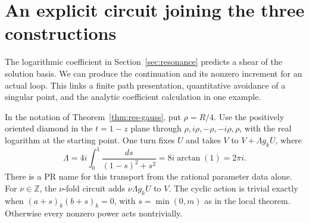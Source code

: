 \section{An explicit circuit joining the three constructions}\label{sec:circuit}
The logarithmic coefficient in Section~\ref{sec:resonance} predicts a shear of the solution basis. We can produce the continuation and its nonzero increment for an actual loop. This links a finite path presentation, quantitative avoidance of a singular point, and the analytic coefficient calculation in one example.

\begin{theorem}\label{thm:circuit}
In the notation of Theorem~\ref{thm:res-gauss}, put $\rho=R/4$. Use the positively oriented diamond in the $t=1-z$ plane through $\rho,i\rho,-\rho,-i\rho,\rho$, with the real logarithm at the starting point. One turn fixes $U$ and takes $V$ to $V+\Lambda g_kU$, where
\[
 \Lambda=4i\int_0^1\frac{ds}{(1-s)^2+s^2}
         =8i\arctan(1)=2\pi i .
\]
There is a PR name for this transport from the rational parameter data alone. For $\nu\in\mathbb Z$, the $\nu$-fold circuit adds $\nu\Lambda g_k U$ to $V$. The cyclic action is trivial exactly when $(a+s)_k(b+s)_k=0$, with $s=\min(0,m)$ as in the local theorem. Otherwise every nonzero power acts nontrivially.
\end{theorem}

